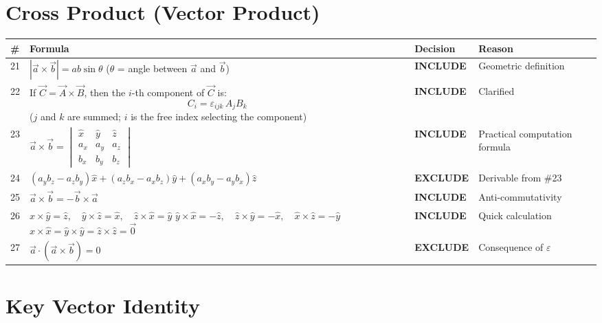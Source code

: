 \documentclass[11pt,a4paper]{article}
\newcommand{\inc}{\textbf{\textcolor{incgreen}{INCLUDE}}}
\newcommand{\exc}{\textbf{\textcolor{exred}{EXCLUDE}}}
\begin{document}
\section{Cross Product (Vector Product)}

\begin{longtable}{p{0.5cm} p{7.5cm} p{2.2cm} p{3.5cm}}
\toprule
\# & Formula & Decision & Reason \\
\midrule
\endhead
21 & $|\vec{a}\times\vec{b}| = ab\sin\theta$ \quad ($\theta$ = angle between $\vec{a}$ and $\vec{b}$) & \inc & Geometric definition \\[10pt]
22 & If $\vec{C} = \vec{A}\times\vec{B}$, then the $i$-th component of $\vec{C}$ is:
\[ C_i = \varepsilon_{ijk}\,A_j B_k \]
($j$ and $k$ are summed; $i$ is the free index selecting the component)
& \inc & Clarified \\[18pt]
23 & $\vec{a}\times\vec{b} = \begin{vmatrix} \hat{x} & \hat{y} & \hat{z} \\ a_x & a_y & a_z \\ b_x & b_y & b_z \end{vmatrix}$ & \inc & Practical computation formula \\[24pt]
24 & $(a_yb_z - a_zb_y)\hat{x} + (a_zb_x - a_xb_z)\hat{y} + (a_xb_y - a_yb_x)\hat{z}$ & \exc & Derivable from \#23 \\[10pt]
25 & $\vec{a}\times\vec{b} = -\vec{b}\times\vec{a}$ & \inc & Anti-commutativity \\[10pt]
26 & $\hat{x}\times\hat{y}=\hat{z},\quad \hat{y}\times\hat{z}=\hat{x},\quad \hat{z}\times\hat{x}=\hat{y}$ \newline
   $\hat{y}\times\hat{x}=-\hat{z},\quad \hat{z}\times\hat{y}=-\hat{x},\quad \hat{x}\times\hat{z}=-\hat{y}$ \newline
   $\hat{x}\times\hat{x}=\hat{y}\times\hat{y}=\hat{z}\times\hat{z}=\vec{0}$ & \inc & Quick calculation \\[10pt]
27 & $\vec{a}\cdot(\vec{a}\times\vec{b})=0$ & \exc & Consequence of $\varepsilon$ \\[6pt]
\bottomrule
\end{longtable}

\section{Key Vector Identity}
\end{document}
